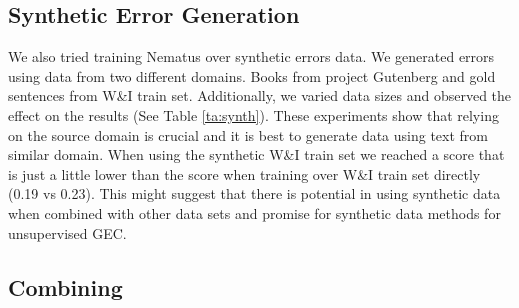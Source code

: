 \documentclass[11pt,a4paper]{article}
\begin{document}
\subsection{Synthetic Error Generation} \label{subsec:synth_exp}
\begin{table}[htb]
\caption{Size of synthetic datasets and Nematus scores when trained on them. \label{ta:synth}}
\end{table}
We also tried training Nematus over synthetic errors data. We generated errors using data from two different domains. Books from project Gutenberg and gold sentences from W\&I train set. Additionally, we varied data sizes and observed the effect on the results (See Table \ref{ta:synth}). These experiments show that relying on the source domain is crucial and it is best to generate data using text from similar domain. When using the synthetic W\&I train set we reached a score that is just a little lower than the score when training over W\&I train set directly (0.19 vs 0.23). This might suggest that there is potential in using synthetic data when combined with other data sets and promise for synthetic data methods for unsupervised GEC.

\subsection{Combining} \label{sec:merge}
\end{document}

